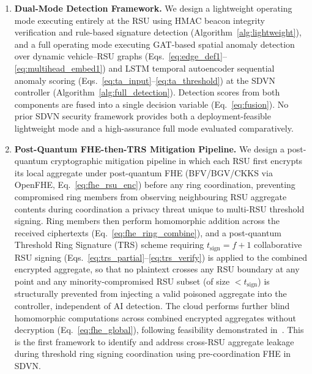 \documentclass[12pt, a4paper]{report}
\begin{document}
\begin{enumerate}
\item \textbf{Dual-Mode Detection Framework.}
We design a lightweight operating mode executing entirely at the RSU
using HMAC beacon integrity verification and rule-based signature
detection (Algorithm~\ref{alg:lightweight}), and a full operating mode
executing GAT-based spatial anomaly detection over dynamic vehicle--RSU
graphs (Eqs.~\eqref{eq:edge_def1}--\eqref{eq:multihead_embed1}) and LSTM
temporal autoencoder sequential anomaly scoring
(Eqs.~\eqref{eq:ta_input}--\eqref{eq:ta_threshold}) at the SDVN
controller (Algorithm~\ref{alg:full_detection}). Detection scores from
both components are fused into a single decision variable
(Eq.~\eqref{eq:fusion}). No prior SDVN security framework provides
both a deployment-feasible lightweight mode and a high-assurance full
mode evaluated comparatively.

\item \textbf{Post-Quantum FHE-then-TRS Mitigation Pipeline.}
We design a post-quantum cryptographic mitigation pipeline in which
each RSU first encrypts its local aggregate under post-quantum
FHE (BFV/BGV/CKKS via OpenFHE, Eq.~\eqref{eq:fhe_rsu_enc})
before any ring coordination, preventing compromised ring
members from observing neighbouring RSU aggregate contents during
coordination a privacy threat unique to multi-RSU threshold
signing. Ring members then perform homomorphic addition across the
received ciphertexts (Eq.~\eqref{eq:fhe_ring_combine}), and a
post-quantum Threshold Ring Signature (TRS) scheme requiring
$t_{\mathrm{sign}} = f{+}1$ collaborative RSU signing
(Eqs.~\eqref{eq:trs_partial}--\eqref{eq:trs_verify}) is applied to
the combined encrypted aggregate, so that no plaintext crosses
any RSU boundary at any point and any minority-compromised RSU subset
(of size $< t_{\mathrm{sign}}$) is structurally prevented from
injecting a valid poisoned aggregate into the controller, independent
of AI detection. The cloud performs further blind homomorphic
computations across combined encrypted aggregates without decryption
(Eq.~\eqref{eq:fhe_global}), following feasibility demonstrated
in~\cite{mamun2025postquantum}. This is the first framework to
identify and address cross-RSU aggregate leakage during threshold
ring signing coordination using pre-coordination FHE in SDVN.


\end{enumerate}
\end{document}
